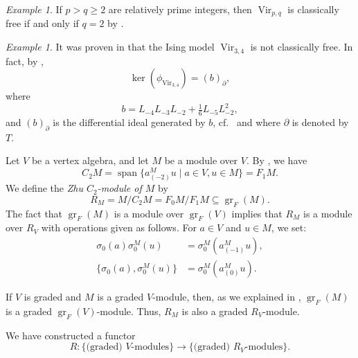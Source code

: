 \documentclass[a4paper, 12pt, reqno]{amsart}
\theoremstyle{remark}
\newtheorem{example}[theorem]{Example}
\DeclareMathOperator{\Vir}{Vir}
\DeclareMathOperator{\gr}{gr}
\DeclareMathOperator{\vspan}{span}
\begin{document}
\begin{example}
  \label{exa:11}
  If $p > q \ge 2$ are relatively prime integers, then $\Vir_{p, q}$ is classically free if and only if $q = 2$ by \cite{van_ekeren_chiral_2021}.
\end{example}

\begin{example}
  \label{exa:12}
  It was proven in \cite{andrews_singular_2022} that the Ising model $\Vir_{3, 4}$ is not classically free.
  In fact, by \cite[Theorem 2]{andrews_singular_2022},
  \begin{equation*}
    \ker(\phi_{\Vir_{3, 4}}) = (b)_{\partial},
  \end{equation*}
  where
  \begin{equation*}
    b = L_{-4}L_{-3}L_{-2} + \tfrac{1}{6}L_{-5}L_{-2}^2,
  \end{equation*}
  and $(b)_{\partial}$ is the differential ideal generated by $b$, cf.\  and  where $\partial$ is denoted by $T$.
\end{example}

Let $V$ be a vertex algebra, and let $M$ be a module over $V$.
By , we have
\begin{equation*}
  C_2M = \vspan\{a^M_{(-2)}u \mid a \in V, u \in M\} = F_1M.
\end{equation*}
We define the \emph{Zhu $C_2$-module of $M$} by
\begin{equation*}
  R_M = M/C_2M = F_0M/F_1M \subseteq \gr_F(M).
\end{equation*}
The fact that $\gr_F(M)$ is a module over $\gr_F(V)$ implies that $R_M$ is a module over $R_V$ with operations given as follows.
For $a \in V$ and $u \in M$, we set:
\begin{align*}
  \sigma_0(a)\sigma^M_0(u) &= \sigma^M_0(a^M_{(-1)}u), \\
  \{\sigma_0(a), \sigma^M_0(u)\} &= \sigma^M_0(a^M_{(0)}u).
\end{align*}

If $V$ is graded and $M$ is a graded $V$-module, then, as we explained in , $\gr_F(M)$ is a graded $\gr_F(V)$-module.
Thus, $R_M$ is also a graded $R_V$-module.

We have constructed a functor
\begin{equation*}
  R: \{\text{(graded) $V$-modules}\} \to \{\text{(graded) $R_V$-modules}\}.
\end{equation*}
\end{document}
